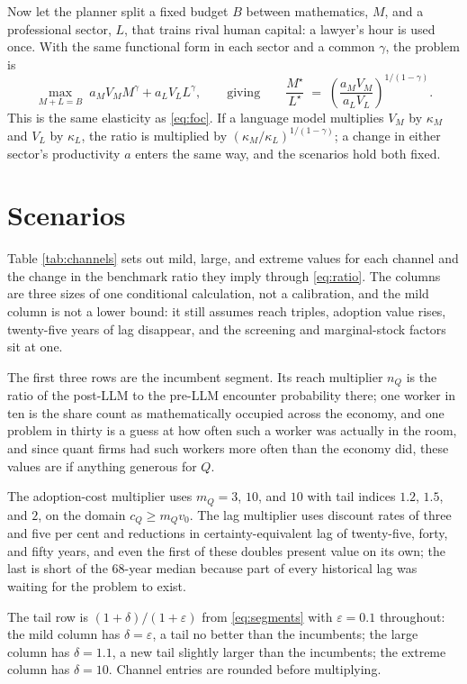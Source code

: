 \documentclass[11pt]{article}
\theoremstyle{definition}
\theoremstyle{remark}
\begin{document}
Now let the planner split a fixed budget $B$ between mathematics, $M$, and a professional sector, $L$, that trains rival human capital: a lawyer's hour is used once. With the same functional form in each sector and a common $\gamma$, the problem is
\begin{equation}
\max_{M + L = B}\; a_M V_M M^{\gamma} + a_L V_L L^{\gamma},
\qquad
\text{giving}
\qquad
\frac{M^{\star}}{L^{\star}} \;=\; \left(\frac{a_M V_M}{a_L V_L}\right)^{1/(1-\gamma)}.
\label{eq:ratio}
\end{equation}
This is the same elasticity as \eqref{eq:foc}. If a language model multiplies $V_M$ by $\kappa_M$ and $V_L$ by $\kappa_L$, the ratio is multiplied by $(\kappa_M / \kappa_L)^{1/(1-\gamma)}$; a change in either sector's productivity $a$ enters the same way, and the scenarios hold both fixed.

\section{Scenarios}

Table \ref{tab:channels} sets out mild, large, and extreme values for each channel and the change in the benchmark ratio they imply through \eqref{eq:ratio}. The columns are three sizes of one conditional calculation, not a calibration, and the mild column is not a lower bound: it still assumes reach triples, adoption value rises, twenty-five years of lag disappear, and the screening and marginal-stock factors sit at one.

The first three rows are the incumbent segment. Its reach multiplier $n_Q$ is the ratio of the post-LLM to the pre-LLM encounter probability there; one worker in ten is the share \citet{deloitte2013} count as mathematically occupied across the economy, and one problem in thirty is a guess at how often such a worker was actually in the room, and since quant firms had such workers more often than the economy did, these values are if anything generous for $Q$.

The adoption-cost multiplier uses $m_Q = 3$, $10$, and $10$ with tail indices $1.2$, $1.5$, and $2$, on the domain $c_Q \ge m_Q v_0$. The lag multiplier uses discount rates of three and five per cent and reductions in certainty-equivalent lag of twenty-five, forty, and fifty years, and even the first of these doubles present value on its own; the last is short of the 68-year median because part of every historical lag was waiting for the problem to exist.

The tail row is $(1+\delta)/(1+\varepsilon)$ from \eqref{eq:segments} with $\varepsilon = 0.1$ throughout: the mild column has $\delta = \varepsilon$, a tail no better than the incumbents; the large column has $\delta = 1.1$, a new tail slightly larger than the incumbents; the extreme column has $\delta = 10$. Channel entries are rounded before multiplying.
\end{document}
